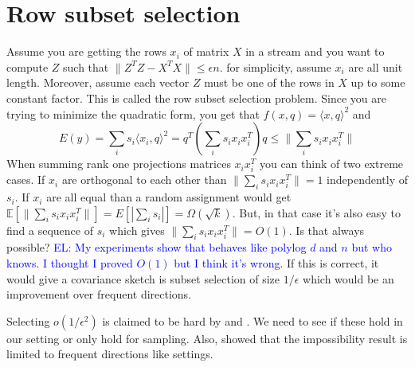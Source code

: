\documentclass{article} %
\newcommand{\el}[1]{\textcolor{blue}{EL: #1}}
\newcommand{\E}{\mathbb{E}}
\newcommand{\eps}{\epsilon}
\begin{document}
%
%



\section{Row subset selection}
Assume you are getting the rows $x_i$  of matrix $X$ in a stream and you want to compute $Z$ such that $\|Z^TZ - X^TX\| \le \eps n$.
for simplicity, assume $x_i$ are all unit length. Moreover, assume each vector $Z$ must be one of the rows in $X$ up to some constant factor.
This is called the row subset selection problem. 
Since you are trying to minimize the quadratic form, you get that $f(x, q) = \langle x,q \rangle ^2$ and 
$$E(y) = \sum_i s_i \langle x_i,q \rangle ^2 = q^T (\sum_i s_i x_i x_i^T ) q \le \|\sum_i s_i x_i x_i^T\|$$
When summing rank one projections matrices $x_i x_i^T$ you can think of two extreme cases. 
If $x_i$ are orthogonal to each other than $\|\sum_i s_i x_i x_i^T\| = 1$ independently of $s_i$.
If $x_i$ are all equal than a random assignment would get  $\E[\|\sum_i s_i x_i x_i^T\|] = E[|\sum_i s_i|] = \Omega(\sqrt{k})$.
But, in that case it's also easy to find a sequence of $s_i$ which gives $\|\sum_i s_i x_i x_i^T\| = O(1)$. Is that always possible?
\el{My experiments show that behaves like polylog $d$ and $n$ but who knows. I thought I proved $O(1)$ but I think it's wrong.}
If this is correct, it would give a covariance sketch is subset selection of size $1/\eps$ which would be an improvement over frequent directions.

Selecting $o(1/\eps^2)$ is claimed to be hard by \cite{DBLP:conf/focs/DeshpandeR10} and \cite{DBLP:conf/soda/DeshpandeRVW06}. We need to see if these hold in our setting or only hold for sampling.  Also, \cite{DBLP:conf/soda/GhashamiP14} showed that the impossibility result is limited to frequent directions like settings.
\end{document}
